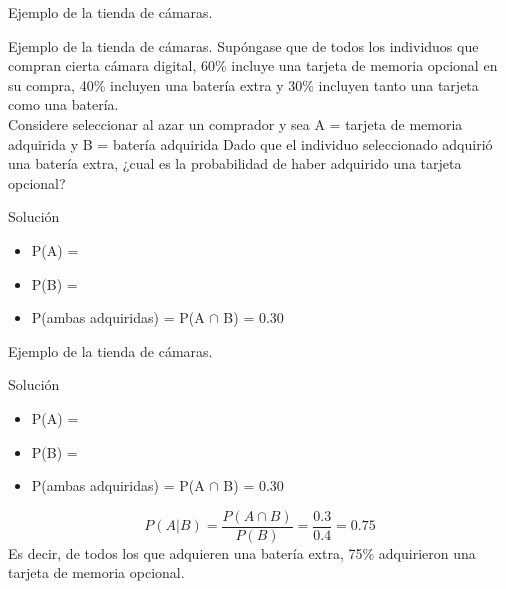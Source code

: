 \documentclass[11pt]{beamer}
\begin{document}
        \begin{frame}{Ejemplo de la tienda de cámaras.}
            \begin{block}{Ejemplo de la tienda de cámaras.}
              Supóngase que de todos los individuos que compran cierta cámara digital, 60\% incluye
una tarjeta de memoria opcional en su compra, 40\% incluyen una batería extra y 30\% incluyen tanto una tarjeta como una batería. \\

              Considere seleccionar al azar un comprador y sea A = {tarjeta de memoria adquirida} y B = {batería adquirida}
              Dado que el individuo seleccionado adquirió una batería extra, ¿cual es la probabilidad de haber adquirido una tarjeta opcional?
            \end{block}
            \begin{block}{Solución}
               \begin{itemize}
                   \item P(A) = 
                   \item P(B) = 
                   \item P(ambas adquiridas) = \pause P(A $\cap$ B) = 0.30
               \end{itemize}
            \end{block}
        \end{frame}

        \begin{frame}{Ejemplo de la tienda de cámaras.}

            \begin{block}{Solución}
                \begin{itemize}
                    \item P(A) = 
                    \item P(B) = 
                    \item P(ambas adquiridas) = \pause P(A $\cap$ B) = 0.30
                \end{itemize}

            \end{block}
            \pause
            $$P(A|B)=\dfrac{P(A\cap B)}{P(B)} = \dfrac{0.3}{0.4} = 0.75 $$
            Es decir, de todos los que adquieren una batería extra, 75\% adquirieron una tarjeta de memoria opcional.
        \end{frame}
\end{document}
